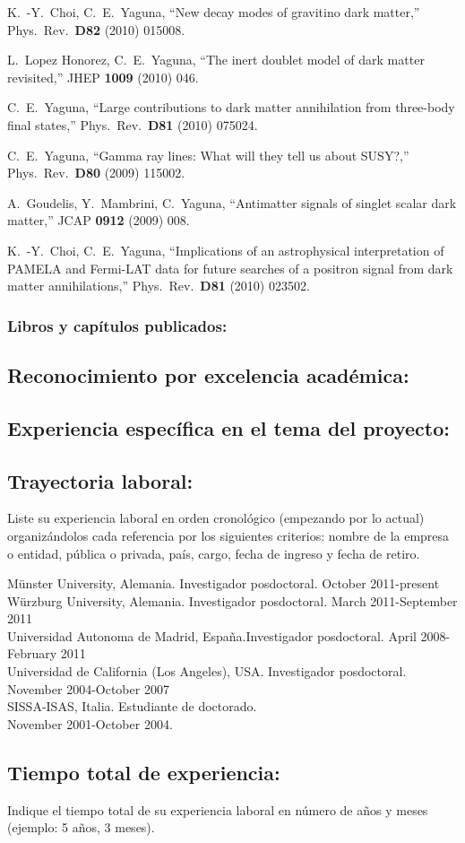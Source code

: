  K.~-Y.~Choi, C.~E.~Yaguna,
  ``New decay modes of gravitino dark matter,''
  Phys.\ Rev.\  {\bf D82 } (2010)  015008.

  L.~Lopez Honorez, C.~E.~Yaguna,
  ``The inert doublet model of dark matter revisited,''
  JHEP {\bf 1009 } (2010)  046.

  C.~E.~Yaguna,
  ``Large contributions to dark matter annihilation from three-body final states,''
  Phys.\ Rev.\  {\bf D81 } (2010)  075024.

  C.~E.~Yaguna,
  ``Gamma ray lines: What will they tell us about SUSY?,''
  Phys.\ Rev.\  {\bf D80 } (2009)  115002.

  A.~Goudelis, Y.~Mambrini, C.~Yaguna,
  ``Antimatter signals of singlet scalar dark matter,''
  JCAP {\bf 0912 } (2009)  008.

  K.~-Y.~Choi, C.~E.~Yaguna,
  ``Implications of an astrophysical interpretation of PAMELA and Fermi-LAT data for future searches of a positron signal from dark matter annihilations,''
  Phys.\ Rev.\  {\bf D81 } (2010)  023502.
\subsubsection{Libros y capítulos publicados:}
\subsection{Reconocimiento por excelencia académica:}
\subsection{Experiencia específica en el tema del proyecto:}
\subsection{Trayectoria laboral:}
\begin{instrucciones}
  Liste su experiencia laboral en orden cronológico (empezando por lo
  actual) organizándolos cada referencia por los siguientes criterios:
  nombre de la empresa o entidad, pública o privada, país, cargo,
  fecha de ingreso y fecha de retiro.
\end{instrucciones}
M\"unster University, Alemania. Investigador posdoctoral. October 2011-present\\
W\"urzburg University, Alemania. Investigador posdoctoral. March 2011-September 2011\\
Universidad Autonoma de Madrid, España.Investigador posdoctoral. April 2008-February 2011\\
Universidad de California (Los Angeles), USA. Investigador posdoctoral. November 2004-October 2007\\
SISSA-ISAS, Italia. Estudiante de doctorado.\\ November 2001-October 2004.\\
\subsection{Tiempo total de experiencia:}
\begin{instrucciones}
  Indique el tiempo total de su experiencia laboral en número de años
  y meses (ejemplo: 5 años, 3 meses).
\end{instrucciones}


